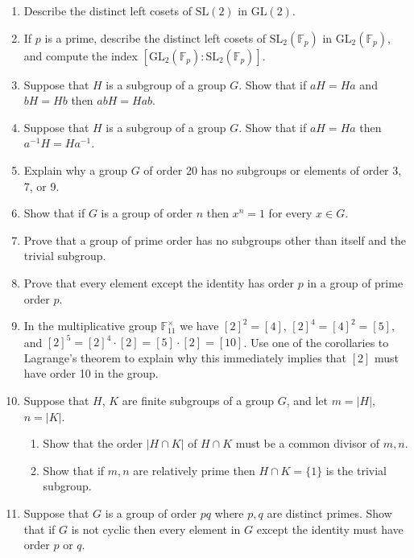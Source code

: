 \documentclass[11pt,oneside]{article}
\newenvironment{problems}
{
 \begin{enumerate}[topsep=1pt,itemsep=0pt,parsep=2pt,leftmargin=0.6cm,%
 label={\arabic*.}, ref=\arabic*] \small
}
{
 \end{enumerate}
}
\theoremstyle{definition}
\newcommand{\F}{{\mathbb F}}
\newcommand{\GL}{\mathrm{GL}}
\newcommand{\SL}{\mathrm{SL}}
\begin{document}
\begin{problems}
\item Describe the distinct left cosets of $\SL(2)$ in $\GL(2)$.

\item If $p$ is a prime, describe the distinct left cosets of
  $\SL_2(\F_p)$ in $\GL_2(\F_p)$, and compute the index $[\GL_2(\F_p):
  \SL_2(\F_p)]$.

\item Suppose that $H$ is a subgroup of a group $G$. Show that if $aH
  = Ha$ and $bH=Hb$ then $abH = Hab$.

\item Suppose that $H$ is a subgroup of a group $G$. Show that if $aH
  = Ha$ then $a^{-1} H = H a^{-1} $.

\item Explain why a group $G$ of order 20 has no subgroups or elements
  of order 3, 7, or 9.

\item Show that if $G$ is a group of order $n$ then $x^n = 1$ for
  every $x \in G$. 
  

\item Prove that a group of prime order has no subgroups other than
  itself and the trivial subgroup.

\item Prove that every element except the identity has order $p$ in a
  group of prime order $p$.


\item In the multiplicative group $\F_{11}^\times$ we have $[2]^2 =
  [4]$, $[2]^4=[4]^2 =[5]$, and $[2]^5 = [2]^4 \cdot [2] = [5] \cdot
  [2] = [10]$. Use one of the corollaries to Lagrange's theorem to
  explain why this immediately implies that $[2]$ must have order 10
  in the group.

\item Suppose that $H$, $K$ are finite subgroups of a group $G$, and
  let $m = |H|$, $n = |K|$.
  \begin{enumerate}
  \item Show that the order $|H \cap K|$ of $H \cap K$ must be a
    common divisor of $m,n$.
  \item Show that if $m,n$ are relatively prime then $H \cap K =
    \{1\}$ is the trivial subgroup.
  \end{enumerate}
  
\item Suppose that $G$ is a group of order $pq$ where $p,q$ are
  distinct primes. Show that if $G$ is not cyclic then every element
  in $G$ except the identity must have order $p$ or $q$.

\end{problems}
\end{document}
